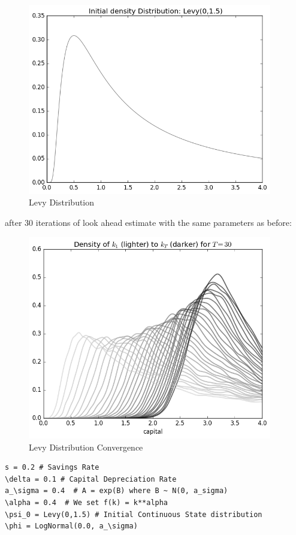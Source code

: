 \documentclass[a4paper,12pt]{article}
\theoremstyle{definition}
\begin{document}
\begin{figure}[h]
\caption{Levy Distribution}
\label{fig:Levy Distribution}
\includegraphics[width=0.95\textwidth]{LevyDist.png} 
\centering
\end{figure}

after 30 iterations of look ahead estimate with the same parameters as before:

\begin{figure}[h]
\caption{Levy Distribution Convergence}
\label{fig:LevyDistConvergence}
\includegraphics[width=0.95\textwidth]{LevyConvergence.png} 
\centering
\end{figure}


\begin{lstlisting}
s = 0.2 # Savings Rate
\delta = 0.1 # Capital Depreciation Rate
a_\sigma = 0.4  # A = exp(B) where B ~ N(0, a_sigma)
\alpha = 0.4  # We set f(k) = k**alpha
\psi_0 = Levy(0,1.5) # Initial Continuous State distribution
\phi = LogNormal(0.0, a_\sigma)
\end{lstlisting}
\end{document}
